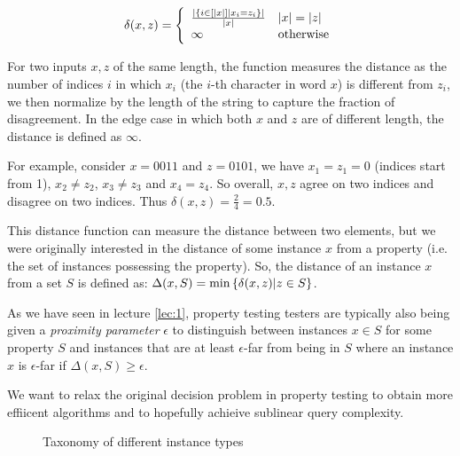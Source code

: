 \[
\delta(x,z) = \left\{\begin{array}{ll}
    \frac{
    \left|\left\{i \in \left[\left|x\right|\right] | x_i = z_i\right\}\right|}{\left|x\right|} & \left|x\right| = \left|z\right| \\
    \infty & \text{otherwise} \\
    
\end{array} \right.
\]

For two inputs \(x,z\) of the same length, the function measures the distance as the number of indices \(i\) in which \(x_i\) (the \(i\)-th character in word \(x\)) is different from \(z_i\), we then normalize by the length of the string to capture the fraction of disagreement. In the edge case in which both \(x\) and \(z\) are of different length, the distance is defined as \(\infty\).

For example, consider \(x = 0011\) and \(z = 0101\), we have \(x_1=z_1=0\) (indices start from 1), \(x_2 \neq z_2\), \(x_3 \neq z_3\) and \(x_4 = z_4\). So overall, \(x,z\) agree on two indices and disagree on two indices. Thus \(\delta(x,z) = \frac{2}{4} = 0.5\).

This distance function can measure the distance between two elements, but we were originally interested in the distance of some instance \(x\) from a property (i.e. the set of instances possessing the property). So, the distance of an instance \(x\) from a set \(S\) is defined as:
\(\Delta(x,S) = \text{min} \left\{\delta(x,z) | z \in S\right\}\).

As we have seen in lecture \ref{lec:1}, property testing testers are typically also being given a \emph{proximity parameter} \(\epsilon\) to distinguish between instances \(x\in S\) for some property \(S\) and instances that are at least \(\epsilon\)-far from being in \(S\) where an instance \(x\) is \(\epsilon\)-far if \(\Delta(x,S) \geq \epsilon\).

We want to relax the original decision problem in property testing to obtain more effiicent algorithms and to hopefully achieive sublinear query complexity. 


\begin{figure}\label{fig:taxonomy}
\centering
\setlength{\fboxsep}{15pt}
\caption{Taxonomy of different instance types}
\end{figure}

